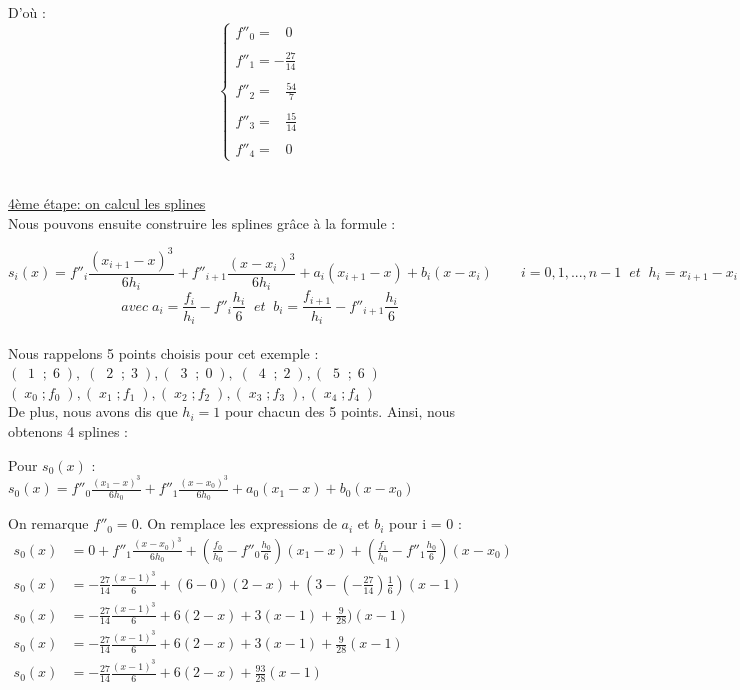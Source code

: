 \documentclass{article}
\begin{document}
D'o\`u :
\[\left\{\begin{array}{ll}
f''_0=\;\;\;0\\\\
f''_1=-\frac{27}{14}\\\\
f''_2=\;\;\;\frac{54}{7}\\\\
f''_3=\;\;\;\frac{15}{14}\\\\
f''_4=\;\;\;0
 \end{array}\right.\]
\\
\begin{flushleft}
	\underline{4\`{e}me \'{e}tape: on calcul les splines}
	\\
	Nous pouvons ensuite construire les splines gr\^{a}ce \`{a} la formule :
\end{flushleft}
\[s_i(x) = f''_i \frac{(x_{i+1}-x)^3}{6h_i}+ f''_{i+1} \frac{(x-x_i)^3}{6h_i}+a_i(x_{i+1}-x) + b_i (x-x_i) \qquad i= 0,1,...,n-1 \;\; et \;\; h_i=x_{i+1}-x_i\]
\[avec \; a_i= \frac{f_i}{h_i}-f''_i \frac{h_i}{6} \;\; et \;\; b_i= \frac{f_{i+1}}{h_i}-f''_{i+1}\frac{h_i}{6}\]
\\
Nous rappelons 5 points choisis pour cet exemple : 
\\
$(\;\;1\;\;;\;6\;),\;(\;\;2\;\;;\;3\;),(\;\;3\;\;;\;0\;),\;(\;\;4\;\;;\;2\;),(\;\;5\;\;;\;6\;)$
\\
$(\;x_0\;;f_0\;),(\;x_1\;;f_1\;),(\;x_2\;;f_2\;),(\;x_3\;;f_3\;),(\;x_4\;;f_4\;)$
\\
De plus, nous avons dis que $h_i=1$ pour chacun des 5 points.
Ainsi, nous obtenons 4 splines : 


\begin{flushleft}
Pour $s_0(x)$ :
\\[10pt]
$s_0(x) = f''_0 \frac{(x_1-x)^3}{6h_0}+ f''_1 \frac{(x-x_0)^3}{6h_0}+a_0(x_1-x) + b_0 (x-x_0)$
\end{flushleft}

\begin{flushleft}
	On remarque $f''_0 = 0$. On remplace les expressions de $a_i$ et $b_i$ pour i = 0 :
\begin{align*}
s_0(x) & = 0 + f''_1 \frac{(x-x_0)^3}{6h_0}+(\frac{f_0}{h_0}-f''_0 \frac{h_0}{6})(x_1-x) + (\frac{f_1}{h_0}-f''_1\frac{h_0}{6})(x-x_0) 
\\[5pt]  
s_0(x) & = -\frac{27}{14} \frac{(x-1)^3}{6}+(6-0)(2-x) + (3-(-\frac{27}{14})\frac{1}{6})(x-1)
\\[5pt]
s_0(x) &  = -\frac{27}{14} \frac{(x-1)^3}{6}+6(2-x) + 3(x-1) + \frac{9}{28})(x-1)
\\[5pt]
s_0(x) & = -\frac{27}{14} \frac{(x-1)^3}{6}+ 6(2-x) + 3(x-1) + \frac{9}{28}(x-1)
\\[5pt]
s_0(x) & = -\frac{27}{14} \frac{(x-1)^3}{6}+ 6(2-x) + \frac{93}{28}(x-1)
\end{align*}
\end{flushleft}
\end{document}
